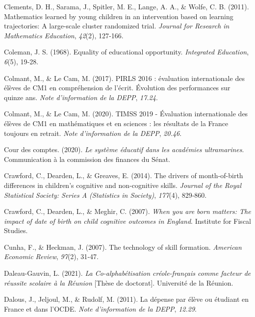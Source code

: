 \documentclass[
]{book}
\newlength{\cslhangindent}
\newlength{\cslentryspacingunit} %
\newenvironment{CSLReferences}[2] %
 {%
  \setlength{\parindent}{0pt}
  \ifodd #1
  \let\oldpar\par
  \def\par{\hangindent=\cslhangindent\oldpar}
  \fi
  \setlength{\parskip}{#2\cslentryspacingunit}
 }%
 {}
\begin{document}
\begin{CSLReferences}{1}{2}
\leavevmode{}%
Clements, D. H., Sarama, J., Spitler, M. E., Lange, A. A., \& Wolfe, C. B. (2011). Mathematics learned by young children in an intervention based on learning trajectories: A large-scale cluster randomized trial. \emph{Journal for Research in Mathematics Education}, \emph{42}(2), 127‑166.

\leavevmode{}%
Coleman, J. S. (1968). Equality of educational opportunity. \emph{Integrated Education}, \emph{6}(5), 19‑28.

\leavevmode{}%
Colmant, M., \& Le Cam, M. (2017). PIRLS 2016 : évaluation internationale des élèves de CM1 en compréhension de l'écrit. Évolution des performances sur quinze ans. \emph{Note d'information de la DEPP}, \emph{17.24}.

\leavevmode{}%
Colmant, M., \& Le Cam, M. (2020). TIMSS 2019 - Évaluation internationale des élèves de CM1 en mathématiques et en sciences : les résultats de la France toujours en retrait. \emph{Note d'information de la DEPP}, \emph{20.46}.

\leavevmode{}%
Cour des comptes. (2020). \emph{Le système éducatif dans les académies ultramarines}. Communication à la commission des finances du Sénat.

\leavevmode{}%
Crawford, C., Dearden, L., \& Greaves, E. (2014). The drivers of month-of-birth differences in children's cognitive and non-cognitive skills. \emph{Journal of the Royal Statistical Society: Series A (Statistics in Society)}, \emph{177}(4), 829‑860.

\leavevmode{}%
Crawford, C., Dearden, L., \& Meghir, C. (2007). \emph{When you are born matters: The impact of date of birth on child cognitive outcomes in England}. Institute for Fiscal Studies.

\leavevmode{}%
Cunha, F., \& Heckman, J. (2007). The technology of skill formation. \emph{American Economic Review}, \emph{97}(2), 31‑47.

\leavevmode{}%
Daleau-Gauvin, L. (2021). \emph{La Co-alphab{é}tisation cr{é}ole-fran{ç}ais comme facteur de r{é}ussite scolaire {à} la R{é}union} {[}Thèse de doctorat{]}. Universit{é} de la R{é}union.

\leavevmode{}%
Dalous, J., Jeljoul, M., \& Rudolf, M. (2011). La d{é}pense par {é}l{è}ve ou {é}tudiant en France et dans l'OCDE. \emph{Note d'information de la DEPP}, \emph{12.29}.


\end{CSLReferences}
\end{document}
